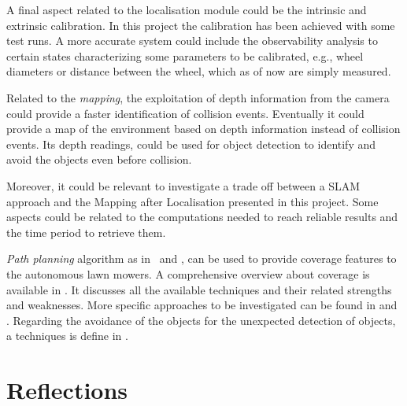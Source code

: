 A final aspect related to the localisation module could be the intrinsic and extrinsic calibration.
In this project the calibration has been achieved with some test runs.
A more accurate system could include the observability analysis to certain states characterizing some parameters to be calibrated, e.g., wheel diameters or distance between the wheel, which as of now are simply measured.


Related to the \textit{mapping}, the exploitation of depth information from the camera could provide a faster identification of collision events.
Eventually it could provide a map of the environment based on depth information instead of collision events.
Its depth readings, could be used for object detection to identify and avoid the objects even before collision.

Moreover, it could be relevant to investigate a trade off between a \gls{SLAM} approach and the Mapping after Localisation presented in this project.
Some aspects could be related to the computations needed to reach reliable results and the time period to retrieve them.



\textit{Path planning} algorithm as in~\cite{coveragePathplanning} and \cite{machines6040046}, can be used to provide coverage features to the autonomous lawn mowers.
A comprehensive overview about coverage is available in \cite{galceran_survey_2013}. It discusses all the available techniques and their related strengths and weaknesses.
More specific approaches to be investigated can be found in \cite{hameed_coverage_2017} and \cite{cabreira_grid-based_2019}.
Regarding the avoidance of the objects for the unexpected detection of objects, a techniques is define in \cite{daltorio_obstacle-edging_2010}.



\section{Reflections}
\label{sec:reflections}

